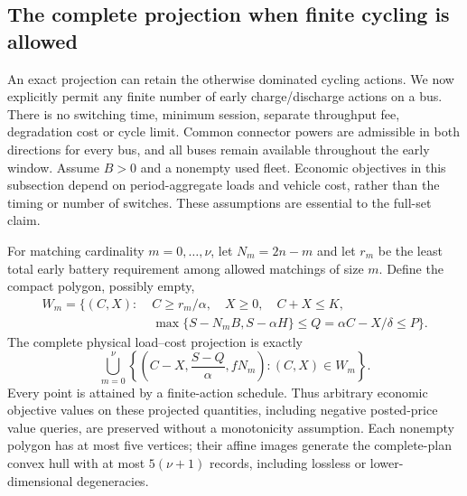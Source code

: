 \subsection{The complete projection when finite cycling is allowed}
\label{sec:fulllossyprojection}
An exact projection can retain the otherwise dominated cycling actions.
We now explicitly permit any finite number of early charge/discharge
actions on a bus. There is no switching time, minimum session, separate
throughput fee, degradation cost or cycle limit. Common connector powers
are admissible in both directions for every bus, and all buses remain
available throughout the early window. Assume $B>0$ and a nonempty used
fleet. Economic objectives in this subsection depend on period-aggregate
loads and vehicle cost, rather than the timing or number of switches.
These assumptions are essential to the full-set claim.

\begin{theorem}
\label{thm:fulllossyprojection}
For matching cardinality $m=0,\ldots,\nu$, let $N_m=2n-m$ and let
$r_m$ be the least total early battery requirement among allowed
matchings of size $m$. Define the compact polygon, possibly empty,
\begin{equation}\label{eq:fulllossypolygon}
\begin{split}
 W_m=\bigl\{(C,X):\;&C\ge r_m/\alpha,\quad X\ge0,\quad C+X\le K,\\
 &\max\{S-N_mB,S-\alpha H\}
       \le Q=\alpha C-X/\delta\le P\bigr\}.
\end{split}
\end{equation}
The complete physical load--cost projection is exactly
\[
 \bigcup_{m=0}^{\nu}
 \left\{\left(C-X,\frac{S-Q}{\alpha},fN_m\right):(C,X)\in W_m\right\}.
\]
Every point is attained by a finite-action schedule. Thus arbitrary
economic objective values on these projected quantities, including
negative posted-price value queries, are preserved without a monotonicity
assumption. Each nonempty polygon has at most five vertices; their affine
images generate the complete-plan convex hull with at most
$5(\nu+1)$ records, including lossless or lower-dimensional degeneracies.
\end{theorem}

